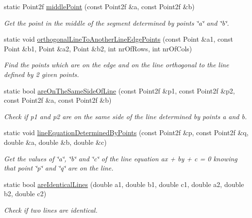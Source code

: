 \begin{DoxyCompactItemize}
static \-Point2f \hyperlink{classmultiscale_1_1Geometry2D_a178c13bdb5cc3f26de7d5e9fd05781f5}{middle\-Point} (const \-Point2f \&a, const \-Point2f \&b)
\begin{DoxyCompactList}\small\item\em \-Get the point in the middle of the segment determined by points \char`\"{}a\char`\"{} and \char`\"{}b\char`\"{}. \end{DoxyCompactList}\item 
static void \hyperlink{classmultiscale_1_1Geometry2D_a3da27e8cecb0a0d2733afa85d356a912}{orthogonal\-Line\-To\-Another\-Line\-Edge\-Points} (const \-Point \&a1, const \-Point \&b1, \-Point \&a2, \-Point \&b2, int nr\-Of\-Rows, int nr\-Of\-Cols)
\begin{DoxyCompactList}\small\item\em \-Find the points which are on the edge and on the line orthogonal to the line defined by 2 given points. \end{DoxyCompactList}\item 
static bool \hyperlink{classmultiscale_1_1Geometry2D_a828b7b579420ac06dabd7c4ba4d081ae}{are\-On\-The\-Same\-Side\-Of\-Line} (const \-Point2f \&p1, const \-Point2f \&p2, const \-Point2f \&a, const \-Point2f \&b)
\begin{DoxyCompactList}\small\item\em \-Check if p1 and p2 are on the same side of the line determined by points a and b. \end{DoxyCompactList}\item 
static void \hyperlink{classmultiscale_1_1Geometry2D_a6d72740d7f1b2441b0829c0f0c6a6853}{line\-Equation\-Determined\-By\-Points} (const \-Point2f \&p, const \-Point2f \&q, double \&a, double \&b, double \&c)
\begin{DoxyCompactList}\small\item\em \-Get the values of \char`\"{}a\char`\"{}, \char`\"{}b\char`\"{} and \char`\"{}c\char`\"{} of the line equation ax + by + c = 0 knowing that point \char`\"{}p\char`\"{} and \char`\"{}q\char`\"{} are on the line. \end{DoxyCompactList}\item 
static bool \hyperlink{classmultiscale_1_1Geometry2D_aaa19f84365e924bacfad4ea893875a42}{are\-Identical\-Lines} (double a1, double b1, double c1, double a2, double b2, double c2)
\begin{DoxyCompactList}\small\item\em \-Check if two lines are identical. \end{DoxyCompactList}\item 

\end{DoxyCompactItemize}
